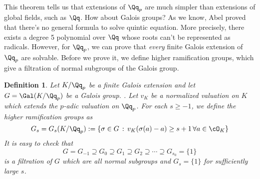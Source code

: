 \documentclass{article}
\newtheorem{definition}{Definition}
\begin{document}
This theorem tells us that extensions of $\Qq_{p}$ are much simpler than extensions of global fields, such as $\Qq$. 
How about Galois groups? 
As we know, Abel proved that there's no general formula to solve quintic equation. More precisely, there exists a degree 5 polynomial over $\Qq$ whose roots can't be represented as radicals. 
However, for $\Qq_{p}$, we can prove that \emph{every} finite Galois extension of $\Qq_p$ are solvable. 
Before we prove it, we define higher ramification groups, which give a filtration of normal subgroups of the Galois group. 
\begin{definition}
Let $K/\Qq_{p}$ be a finite Galois extension and let $G = \Gal(K/\Qq_p)$ be a Galois group. . Let $v_{K}$ be a normalized valuation on $K$ which extends the $p$-adic valuation on $\Qq_p$. 
For each $s\geq -1$, we define the higher ramification groups as
$$
G_{s} = G_{s}(K/\Qq_p) := \{\sigma\in G\,:\, v_{K}(\sigma(a) - a) \geq s+1\,\forall a\in \cO_{K}\}
$$
It is easy to check that 
$$
G = G_{-1} \supseteq G_{0} \supseteq G_{1} \supseteq G_{2} \supseteq \cdots \supseteq G_{s_{0}} = \{1\}
$$
is a filtration of $G$ which are all normal subgroups and $G_{s} = \{1\}$ for sufficiently large $s$. 
\end{definition}
\end{document}
